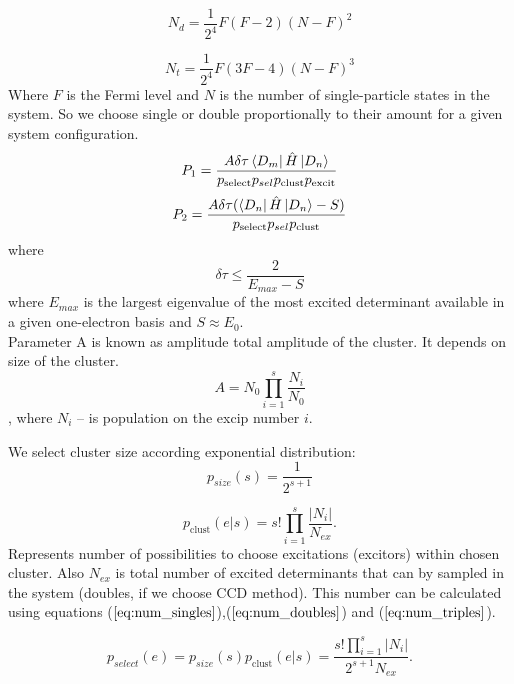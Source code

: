 \documentclass[twoside,english]{uiofysmaster}
\theoremstyle{definition}
\begin{document}
\begin{equation}\label{eq:num_doubles}
N_d = \frac{1}{2^4}F(F-2)(N-F)^2
\end{equation}

\begin{equation}\label{eq:num_triples}
N_t = \frac{1}{2^4}F(3F-4)(N-F)^3
\end{equation}
Where $F$ is the Fermi level and $N$ is the number of single-particle states in the system. So we choose single or double proportionally to their amount for a given system configuration.
\begin{equation}
P_1 = \frac{A \delta \tau \bra{D_m}\hat{H} \ket{D_n}}{p_{\text{select}}p_{sel}p_{\text{clust}}p_{\text{excit}}}
\end{equation}
\begin{equation}
P_2 = \frac{A \delta \tau (\bra{D_n}\hat{H} \ket{D_n}-S)}{p_{\text{select}}p_{sel}p_{\text{clust}}}
\end{equation}
where
\begin{equation}
\delta \tau \leq \frac{2}{E_{max} - S}
\end{equation}
where $E_{max}$ is the largest eigenvalue of the most excited determinant available in a given one-electron basis and $S \approx E_0$.\\
Parameter A is known as amplitude total amplitude of the cluster. It depends on size of the cluster.
\begin{equation}
A = N_0  \prod_{i=1}^s \frac{N_i}{N_0}
\end{equation},
where $N_i$ -- is population on the excip number $i$.

We select cluster size according exponential distribution:
\begin{equation}
p_{size}(s)=\frac{1}{2^{s+1}}
\end{equation}

\begin{equation}
p_{\text{clust}} (e|s)= s! \prod_{i=1}^s \frac{|N_i|}{N_{ex}}.
\end{equation}
Represents number of possibilities to choose excitations (excitors) within chosen cluster. Also $N_{ex}$ is total number of excited determinants that can by sampled in the system (doubles, if we choose CCD method). This number can be calculated using equations ($\ref{eq:num_singles}$),($\ref{eq:num_doubles}$) and ($\ref{eq:num_triples}$).

\begin{equation}
p_{select}(e)= p_{size}(s) p_{\text{clust}} (e|s) =  \frac{s!\prod_{i=1}^{s} |N_i|}{2^{s+1}N_{ex}}.
\end{equation}
\end{document}
